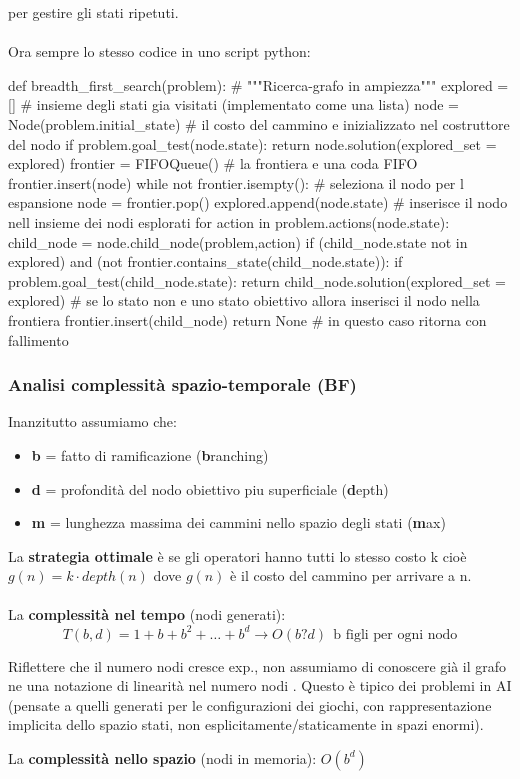 per gestire gli stati ripetuti.\\\\
Ora sempre lo stesso codice in uno script python:
\begin{python}
	def breadth_first_search(problem): # """Ricerca-grafo in ampiezza"""
		explored = [] # insieme degli stati gia visitati (implementato come una lista)
		node = Node(problem.initial_state) # il costo del cammino e inizializzato nel
		costruttore del nodo
		if problem.goal_test(node.state):
			return node.solution(explored_set = explored)
		frontier = FIFOQueue() # la frontiera e una coda FIFO
		frontier.insert(node)
		while not frontier.isempty(): # seleziona il nodo per l espansione
			node = frontier.pop()
			explored.append(node.state) # inserisce il nodo nell insieme dei nodi esplorati
			for action in problem.actions(node.state):
				child_node = node.child_node(problem,action)
				if (child_node.state not in explored) and (not frontier.contains_state(child_node.state)):
					if problem.goal_test(child_node.state):
						return child_node.solution(explored_set = explored)
				# se lo stato non e uno stato obiettivo allora inserisci il nodo nella frontiera
				frontier.insert(child_node)
		return None # in questo caso ritorna con fallimento
\end{python}

\subsubsection{Analisi complessità spazio-temporale (BF)}
Inanzitutto assumiamo che:
\begin{itemize}
	\item \textbf{b} = fatto di ramificazione (\textbf{b}ranching)
	\item \textbf{d} = profondità del nodo obiettivo piu superficiale (\textbf{d}epth) 
	\item \textbf{m} = lunghezza massima dei cammini nello spazio degli stati (\textbf{m}ax)
\end{itemize}
La \textbf{strategia ottimale} è se gli operatori hanno tutti lo stesso costo k cioè $g(n) = k \cdot depth(n)$ dove $g(n)$ è il costo del 
cammino per arrivare a n.\\\\
La \textbf{complessità nel tempo} (nodi generati):
$$T(b, d) = 1 + b + b^2 + \dots + b^d \to O(b?d) \:\: \text{b figli per ogni nodo}$$
\begin{note}
	Riflettere che il numero nodi cresce exp., non assumiamo di conoscere già il
	grafo ne una notazione di linearità nel numero nodi . Questo è tipico dei problemi in
	AI (pensate a quelli generati per le configurazioni dei giochi, con rappresentazione
	implicita dello spazio stati, non esplicitamente/staticamente in spazi enormi).
\end{note}
\hspace{-15pt}La \textbf{complessità nello spazio} (nodi in memoria): $O(b^d)$

